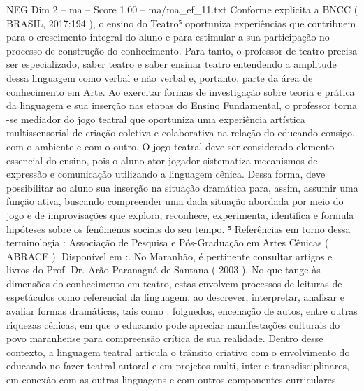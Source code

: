 \begin{textsample}{NEG Dim 2 – ma – Score 1.00 – ma/ma\_ef\_11.txt}
Conforme explicita a BNCC ( BRASIL, 2017:194 ), o ensino do Teatro⁵ oportuniza experiências que contribuem para o crescimento integral do aluno e para estimular a sua participação no processo de construção do conhecimento.
Para tanto, o professor de teatro precisa ser especializado, saber teatro e saber ensinar teatro entendendo a amplitude dessa linguagem como verbal e não verbal e, portanto, parte da área de conhecimento em Arte.
Ao exercitar formas de investigação sobre teoria e prática da linguagem e sua inserção nas etapas do Ensino Fundamental, o professor torna -se mediador do jogo teatral que oportuniza uma experiência artística multissensorial de criação coletiva e colaborativa na relação do educando consigo, com o ambiente e com o outro.
O jogo teatral deve ser considerado elemento essencial do ensino, pois o aluno-ator-jogador sistematiza mecanismos de expressão e comunicação utilizando a linguagem cênica.
Dessa forma, deve possibilitar ao aluno sua inserção na situação dramática para, assim, assumir uma função ativa, buscando compreender uma dada situação abordada por meio do jogo e de improvisações que explora, reconhece, experimenta, identifica e formula hipóteses sobre os fenômenos sociais do seu tempo. ⁵ Referências em torno dessa terminologia : Associação de Pesquisa e Pós-Graduação em Artes Cênicas ( ABRACE ).
Disponível em :.
No Maranhão, é pertinente consultar artigos e livros do Prof.
Dr.
Arão Paranaguá de Santana ( 2003 ).
No que tange às dimensões do conhecimento em teatro, estas envolvem processos de leituras de espetáculos como referencial da linguagem, ao descrever, interpretar, analisar e avaliar formas dramáticas, tais como : folguedos, encenação de autos, entre outras riquezas cênicas, em que o educando pode apreciar manifestações culturais do povo maranhense para compreensão crítica de sua realidade.
Dentro desse contexto, a linguagem teatral articula o trânsito criativo com o envolvimento do educando no fazer teatral autoral e em projetos multi, inter e transdisciplinares, em conexão com as outras linguagens e com outros componentes curriculares.

\end{textsample}
